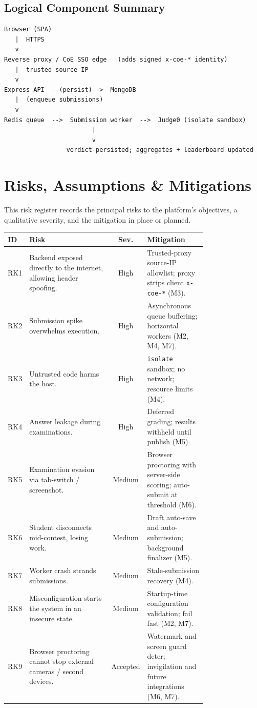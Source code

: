 \documentclass[12pt,a4paper,oneside]{report}
\newcommand{\code}[1]{\texttt{#1}}
\begin{document}
\section{Logical Component Summary}
\begin{lstlisting}[language={}]
Browser (SPA)
   |  HTTPS
   v
Reverse proxy / CoE SSO edge   (adds signed x-coe-* identity)
   |  trusted source IP
   v
Express API  --(persist)-->  MongoDB
   |  (enqueue submissions)
   v
Redis queue  -->  Submission worker  -->  Judge0 (isolate sandbox)
                        |
                        v
                 verdict persisted; aggregates + leaderboard updated
\end{lstlisting}

\chapter{Risks, Assumptions \& Mitigations}
This risk register records the principal risks to the platform's objectives, a
qualitative severity, and the mitigation in place or planned.

\begin{longtable}{@{}p{0.05\linewidth} p{0.42\linewidth} c p{0.30\linewidth}@{}}
\toprule
\textbf{ID} & \textbf{Risk} & \textbf{Sev.} & \textbf{Mitigation}\\
\midrule
\endhead
RK1 & Backend exposed directly to the internet, allowing header spoofing. & High & Trusted-proxy source-IP allowlist; proxy strips client \code{x-coe-*} (M3).\\
RK2 & Submission spike overwhelms execution. & High & Asynchronous queue buffering; horizontal workers (M2, M4, M7).\\
RK3 & Untrusted code harms the host. & High & \code{isolate} sandbox; no network; resource limits (M4).\\
RK4 & Answer leakage during examinations. & High & Deferred grading; results withheld until publish (M5).\\
RK5 & Examination evasion via tab-switch / screenshot. & Medium & Browser proctoring with server-side scoring; auto-submit at threshold (M6).\\
RK6 & Student disconnects mid-contest, losing work. & Medium & Draft auto-save and auto-submission; background finalizer (M5).\\
RK7 & Worker crash strands submissions. & Medium & Stale-submission recovery (M4).\\
RK8 & Misconfiguration starts the system in an insecure state. & Medium & Startup-time configuration validation; fail fast (M2, M7).\\
RK9 & Browser proctoring cannot stop external cameras / second devices. & Accepted & Watermark and screen guard deter; invigilation and future integrations (M6, M7).\\
\bottomrule
\end{longtable}
\end{document}
